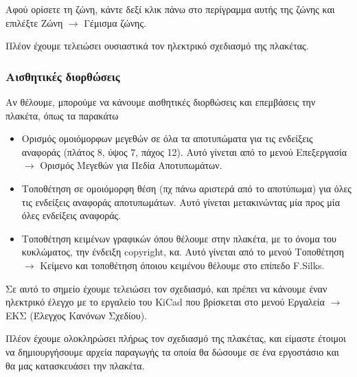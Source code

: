 \documentclass[a4paper]{article}
\begin{document}
Αφού ορίσετε τη ζώνη, κάντε δεξί κλικ πάνω στο περίγραμμα αυτής της ζώνης και επιλέξτε Ζώνη $\rightarrow$ Γέμισμα ζώνης.

Πλέον έχουμε τελειώσει ουσιαστικά τον ηλεκτρικό σχεδιασμό της πλακέτας.


\subsubsection{Αισθητικές διορθώσεις}

Αν θέλουμε, μπορούμε να κάνουμε αισθητικές διορθώσεις και επεμβάσεις την πλακέτα, όπως τα παρακάτω
\begin{itemize}
    \item Ορισμός ομοιόμορφων μεγεθών σε όλα τα αποτυπώματα για τις ενδείξεις αναφοράς (πλάτος 8, ύψος 7, πάχος 12). Αυτό γίνεται από το μενού Επεξεργασία $\rightarrow$ Ορισμός Μεγεθών για Πεδία Αποτυπωμάτων.
    \item Τοποθέτηση σε ομοιόμορφη θέση (πχ πάνω αριστερά από το αποτύπωμα) για όλες τις ενδείξεις αναφοράς αποτυπωμάτων. Αυτό γίνεται μετακινώντας μία προς μία όλες ενδείξεις αναφοράς.
    \item Τοποθέτηση κειμένων γραφικών όπου θέλουμε στην πλακέτα, με το όνομα του κυκλώματος, την ένδειξη copyright, κα. Αυτό γίνεται από το μενού Τοποθέτηση $\rightarrow$ Κείμενο και τοποθέτηση όποιου κειμένου θέλουμε στο επίπεδο F.Silks.
\end{itemize}

\begin{figure}
  \begin{center}
    \label{fig:kicad-main}
  \end{center}
\end{figure}

Σε αυτό το σημείο έχουμε τελειώσει τον σχεδιασμό, και πρέπει να κάνουμε έναν ηλεκτρικό έλεγχο με το εργαλείο του \textenglish{KiCad} που βρίσκεται στο μενού Εργαλεία $\rightarrow$ ΕΚΣ (Έλεγχος Κανόνων Σχεδίου).

Πλέον έχουμε ολοκληρώσει πλήρως τον σχεδιασμό της πλακέτας, και είμαστε έτοιμοι να δημιουργήσουμε αρχεία παραγωγής τα οποία θα δώσουμε σε ένα εργοστάσιο και θα μας κατασκευάσει την πλακέτα.
\end{document}
